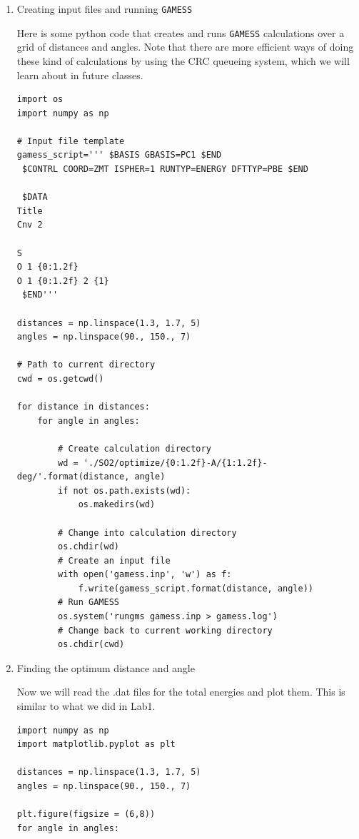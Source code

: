 \documentclass[11pt]{article}
\begin{document}
\begin{enumerate}
\item Creating input files and running \texttt{GAMESS}
\label{sec-3-1-1-1}

Here is some python code that creates and runs \texttt{GAMESS} calculations over a grid of distances and angles. Note that there are more efficient ways of doing these kind of calculations by using the CRC queueing system, which we will learn about in future classes.

\begin{verbatim}
import os
import numpy as np

# Input file template
gamess_script=''' $BASIS GBASIS=PC1 $END
 $CONTRL COORD=ZMT ISPHER=1 RUNTYP=ENERGY DFTTYP=PBE $END

 $DATA 
Title
Cnv 2

S    
O 1 {0:1.2f} 
O 1 {0:1.2f} 2 {1}
 $END'''

distances = np.linspace(1.3, 1.7, 5)
angles = np.linspace(90., 150., 7)

# Path to current directory
cwd = os.getcwd()

for distance in distances:
    for angle in angles:
        
        # Create calculation directory
        wd = './SO2/optimize/{0:1.2f}-A/{1:1.2f}-deg/'.format(distance, angle)
        if not os.path.exists(wd):
            os.makedirs(wd)

        # Change into calculation directory
        os.chdir(wd)
        # Create an input file
        with open('gamess.inp', 'w') as f:
            f.write(gamess_script.format(distance, angle))     
        # Run GAMESS   
        os.system('rungms gamess.inp > gamess.log')
        # Change back to current working directory
        os.chdir(cwd)
\end{verbatim}


\item Finding the optimum distance and angle
\label{sec-3-1-1-2}

Now we will read the .dat files for the total energies and plot them. This is similar to what we did in Lab1. 

\begin{verbatim}
import numpy as np
import matplotlib.pyplot as plt

distances = np.linspace(1.3, 1.7, 5)
angles = np.linspace(90., 150., 7)

plt.figure(figsize = (6,8))
for angle in angles:
    

\end{verbatim}
\end{enumerate}
\end{document}
